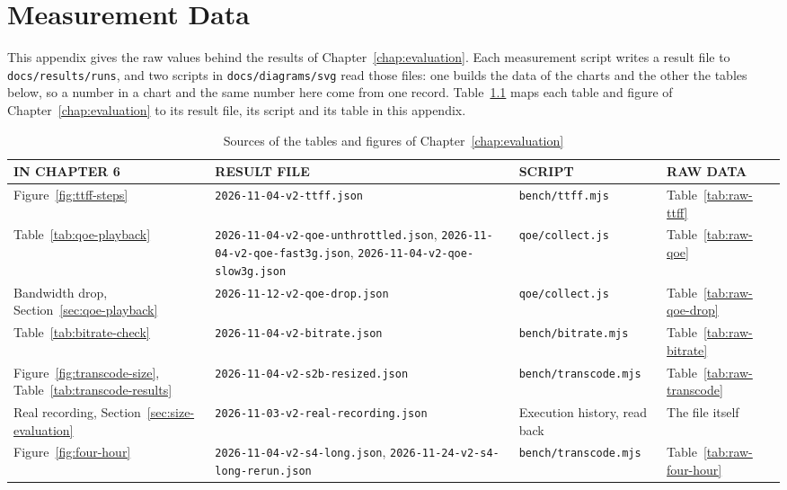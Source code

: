 \chapter{Measurement Data}
\label{app:measurement-tables}

This appendix gives the raw values behind the results of Chapter~\ref{chap:evaluation}. Each
measurement script writes a result file to \mbox{\texttt{docs/results/runs}}, and two scripts in
\mbox{\texttt{docs/diagrams/svg}} read those files: one builds the data of the charts and the other
the tables below, so a number in a chart and the same number here come from one record.
Table~\ref{tab:provenance} maps each table and figure of Chapter~\ref{chap:evaluation} to its result
file, its script and its table in this appendix.

\begin{table}[H]
\centering
\caption{Sources of the tables and figures of Chapter~\ref{chap:evaluation}}
\label{tab:provenance}
\footnotesize
\setlength{\tabcolsep}{4pt}
\begin{tabularx}{\textwidth}{>{\raggedright\arraybackslash}X >{\raggedright\arraybackslash}p{} >{\raggedright\arraybackslash}p{} >{\raggedright\arraybackslash}p{}}
\toprule
\textbf{IN CHAPTER 6} & \textbf{RESULT FILE} & \textbf{SCRIPT} & \textbf{RAW DATA} \\
\midrule
Figure~\ref{fig:ttff-steps} & \texttt{2026-11-04-v2-ttff.json} & \texttt{bench/ttff.mjs} & Table~\ref{tab:raw-ttff} \\
Table~\ref{tab:qoe-playback} & \texttt{2026-11-04-v2-qoe-unthrottled.json}, \texttt{2026-11-04-v2-qoe-fast3g.json}, \texttt{2026-11-04-v2-qoe-slow3g.json} & \texttt{qoe/collect.js} & Table~\ref{tab:raw-qoe} \\
Bandwidth drop, Section~\ref{sec:qoe-playback} & \texttt{2026-11-12-v2-qoe-drop.json} & \texttt{qoe/collect.js} & Table~\ref{tab:raw-qoe-drop} \\
Table~\ref{tab:bitrate-check} & \texttt{2026-11-04-v2-bitrate.json} & \texttt{bench/bitrate.mjs} & Table~\ref{tab:raw-bitrate} \\
Figure~\ref{fig:transcode-size}, Table~\ref{tab:transcode-results} & \texttt{2026-11-04-v2-s2b-resized.json} & \texttt{bench/transcode.mjs} & Table~\ref{tab:raw-transcode} \\
Real recording, Section~\ref{sec:size-evaluation} & \texttt{2026-11-03-v2-real-recording.json} & Execution history, read back & The file itself \\
Figure~\ref{fig:four-hour} & \texttt{2026-11-04-v2-s4-long.json}, \texttt{2026-11-24-v2-s4-long-rerun.json} & \texttt{bench/transcode.mjs} & Table~\ref{tab:raw-four-hour} \\

\end{tabularx}
\end{table}
